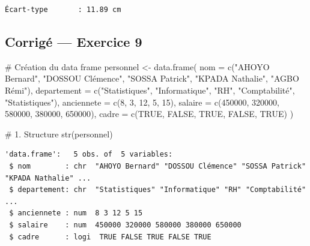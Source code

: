 \documentclass[
  french,
  11pt,
  a4paper,
]{article}
\newenvironment{Shaded}{}{}
\newcommand{\AttributeTok}[1]{\textcolor[rgb]{0.84,0.23,0.29}{#1}}
\newcommand{\CommentTok}[1]{\textcolor[rgb]{0.42,0.45,0.49}{#1}}
\newcommand{\ConstantTok}[1]{\textcolor[rgb]{0.00,0.36,0.77}{#1}}
\newcommand{\DecValTok}[1]{\textcolor[rgb]{0.00,0.36,0.77}{#1}}
\newcommand{\FunctionTok}[1]{\textcolor[rgb]{0.44,0.26,0.76}{#1}}
\newcommand{\NormalTok}[1]{\textcolor[rgb]{0.14,0.16,0.18}{#1}}
\newcommand{\OtherTok}[1]{\textcolor[rgb]{0.44,0.26,0.76}{#1}}
\newcommand{\SpecialCharTok}[1]{\textcolor[rgb]{0.00,0.36,0.77}{#1}}
\newcommand{\StringTok}[1]{\textcolor[rgb]{0.01,0.18,0.38}{#1}}
\begin{document}
\begin{verbatim}
Écart-type       : 11.89 cm
\end{verbatim}

\subsection{Corrigé --- Exercice 9}\label{corriguxe9-exercice-9}

\begin{Shaded}
\begin{Highlighting}[]
\CommentTok{\# Création du data frame}
\NormalTok{personnel }\OtherTok{\textless{}{-}} \FunctionTok{data.frame}\NormalTok{(}
  \AttributeTok{nom =} \FunctionTok{c}\NormalTok{(}\StringTok{"AHOYO Bernard"}\NormalTok{, }\StringTok{"DOSSOU Clémence"}\NormalTok{, }\StringTok{"SOSSA Patrick"}\NormalTok{, }\StringTok{"KPADA Nathalie"}\NormalTok{, }\StringTok{"AGBO Rémi"}\NormalTok{),}
  \AttributeTok{departement =} \FunctionTok{c}\NormalTok{(}\StringTok{"Statistiques"}\NormalTok{, }\StringTok{"Informatique"}\NormalTok{, }\StringTok{"RH"}\NormalTok{, }\StringTok{"Comptabilité"}\NormalTok{, }\StringTok{"Statistiques"}\NormalTok{),}
  \AttributeTok{anciennete =} \FunctionTok{c}\NormalTok{(}\DecValTok{8}\NormalTok{, }\DecValTok{3}\NormalTok{, }\DecValTok{12}\NormalTok{, }\DecValTok{5}\NormalTok{, }\DecValTok{15}\NormalTok{),}
  \AttributeTok{salaire =} \FunctionTok{c}\NormalTok{(}\DecValTok{450000}\NormalTok{, }\DecValTok{320000}\NormalTok{, }\DecValTok{580000}\NormalTok{, }\DecValTok{380000}\NormalTok{, }\DecValTok{650000}\NormalTok{),}
  \AttributeTok{cadre =} \FunctionTok{c}\NormalTok{(}\ConstantTok{TRUE}\NormalTok{, }\ConstantTok{FALSE}\NormalTok{, }\ConstantTok{TRUE}\NormalTok{, }\ConstantTok{FALSE}\NormalTok{, }\ConstantTok{TRUE}\NormalTok{)}
\NormalTok{)}

\CommentTok{\# 1. Structure}
\FunctionTok{str}\NormalTok{(personnel)}
\end{Highlighting}
\end{Shaded}

\begin{verbatim}
'data.frame':   5 obs. of  5 variables:
 $ nom        : chr  "AHOYO Bernard" "DOSSOU Clémence" "SOSSA Patrick" "KPADA Nathalie" ...
 $ departement: chr  "Statistiques" "Informatique" "RH" "Comptabilité" ...
 $ anciennete : num  8 3 12 5 15
 $ salaire    : num  450000 320000 580000 380000 650000
 $ cadre      : logi  TRUE FALSE TRUE FALSE TRUE
\end{verbatim}

\begin{Shaded}
\end{Shaded}
\end{document}
